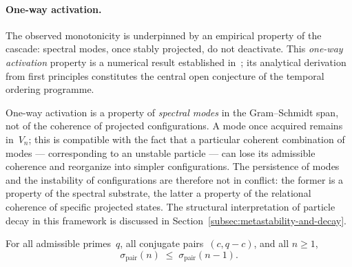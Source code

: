   \paragraph{One-way activation.}
    The observed monotonicity is underpinned by an empirical property of the
    cascade: spectral modes, once stably projected, do not deactivate.
    This \emph{one-way activation} property is a numerical result established
    in~\cite{Beau2026pto}; its analytical derivation from first principles
    constitutes the central open conjecture of the temporal ordering programme.

    One-way activation is a property of \emph{spectral modes} in the
    Gram--Schmidt span, not of the coherence of projected configurations.
    A mode once acquired remains in~$V_n$; this is compatible with the fact
    that a particular coherent combination of modes --- corresponding to an
    unstable particle --- can lose its admissible coherence and reorganize
    into simpler configurations.
    The persistence of modes and the instability of configurations are
    therefore not in conflict: the former is a property of the spectral
    substrate, the latter a property of the relational coherence of specific
    projected states.
    The structural interpretation of particle decay in this framework is
    discussed in Section~\ref{subsec:metastability-and-decay}.

    \begin{conjecture}
      \label{conj:one-way-activation}
      For all admissible primes~$q$, all conjugate pairs~$(c, q{-}c)$, and all
      $n \ge 1$,
      \begin{equation}
        \sigma_{\mathrm{pair}}(n) \;\le\; \sigma_{\mathrm{pair}}(n-1).
      \end{equation}
    \end{conjecture}

